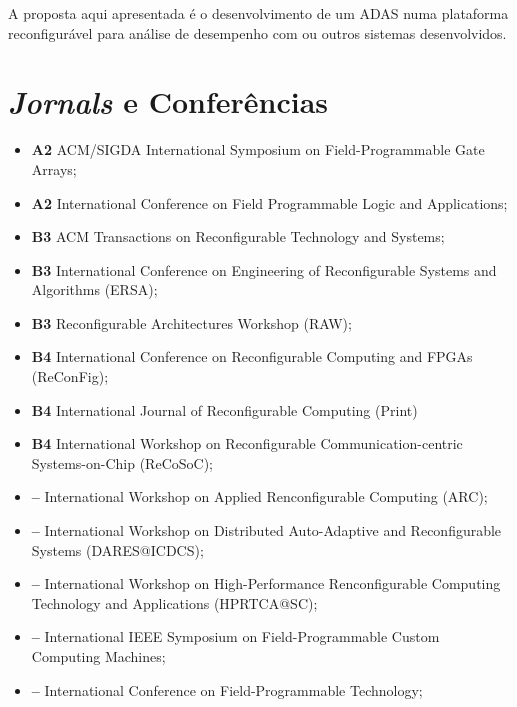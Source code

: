 \documentclass[12pt]{article}
\begin{document}
A proposta aqui apresentada é o desenvolvimento de um ADAS numa plataforma reconfigurável para análise de desempenho com ou outros sistemas desenvolvidos.

\newpage

\section*{\textit{Jornals} e Conferências}

{\it 
	\begin{itemize}
		\item \textbf{A2} ACM/SIGDA International Symposium on Field-Programmable Gate Arrays;
		\item \textbf{A2} International Conference on Field Programmable Logic and Applications;
		\item \textbf{B3} ACM Transactions on Reconfigurable Technology and Systems;
		\item \textbf{B3} International Conference on Engineering of Reconfigurable Systems and Algorithms (ERSA);
		\item \textbf{B3} Reconfigurable Architectures Workshop (RAW);
		\item \textbf{B4} International Conference on Reconfigurable Computing and FPGAs (ReConFig);
		\item \textbf{B4} International Journal of Reconfigurable Computing (Print)
		\item \textbf{B4} International Workshop on Reconfigurable Communication-centric Systems-on-Chip (ReCoSoC);
		\item \textbf{--} International Workshop on Applied Renconfigurable Computing (ARC);
		\item \textbf{--} International Workshop on Distributed Auto-Adaptive and Reconfigurable Systems (DARES@ICDCS);
		\item \textbf{--} International Workshop on High-Performance Renconfigurable Computing Technology and Applications (HPRTCA@SC);
		\item \textbf{--} International IEEE Symposium on Field-Programmable Custom Computing Machines;
		\item \textbf{--} International Conference on Field-Programmable Technology;
	\end{itemize}
}




\end{document}

